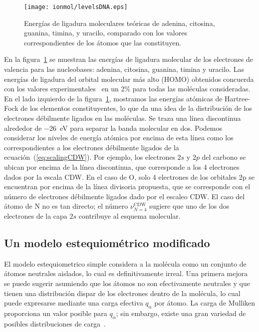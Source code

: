 \begin{figure}
\centering
\texttt{[image: ionmol/levelsDNA.eps]}
\caption[Energías de ligadura moleculares teóricas de ADN y ARN.]
{Energías de ligadura moleculares teóricas de adenina, citosina, guanina, 
timina, y uracilo, comparado con los valores correspondientes de los 
átomos que las constituyen.}
\label{fig:bindener}
\end{figure}

En la figura~\ref{fig:bindener} se muestran las energías de ligadura 
molecular de los electrones de valencia para las nucleobases: adenina, 
citosina, guanina, timina y uracilo. Las energías de ligadura del orbital 
molecular más alto (HOMO) obtenidos concuerda con los valores
experimentales~\cite{Hush,Verkin,Dougherty} en un 2\% para todas las 
moléculas consideradas. En el lado izquierdo de la figura~\ref{fig:bindener}, 
mostramos las energías atómicas de Hartree-Fock de los elementos 
constituyentes, lo que da una idea de la distribución de los electrones
débilmente ligados en las moléculas. Se traza una línea discontinua 
alrededor de $-26$~eV para separar la banda molecular en dos. Podemos 
considerar los niveles de energía atómica por encima de esta línea como 
los correspondientes a los electrones débilmente ligados de la 
ecuación~(\ref{eq:scalingCDW}). Por ejemplo, los electrones $2s$ y $2p$ 
del carbono se ubican por encima de la línea discontinua, que corresponde 
a los 4 electrones dados por la escala CDW. En el caso de O, solo 4 
electrones de los orbitales 2p se encuentran por encima de la línea 
divisoria propuesta, que se corresponde con el número de electrones
débilmente ligados dado por el escaleo CDW. El caso del átomo de N no 
es tan directo; el número $\nu_{N=4}^{\text{CDW}}$ sugiere que uno de 
los dos electrones de la capa $2s$ contribuye al esquema molecular.

\subsection{Un modelo estequiométrico modificado}

El modelo estequiometrico simple considera a la molécula como un 
conjunto de átomos neutrales aislados, lo cual es definitivamente irreal.
Una primera mejora se puede sugerir asumiendo que los átomos no son
efectivamente neutrales y que tienen una distribución dispar de los 
electrones dentro de la molécula, lo cual puede expresarse mediante una
carga efectiva $q_{\alpha}$ por átomo. La carga de Mulliken proporciona
un valor posible para $q_{\alpha}$; sin embargo, existe una gran variedad
de posibles distribuciones de carga~\cite{lee2003}.

